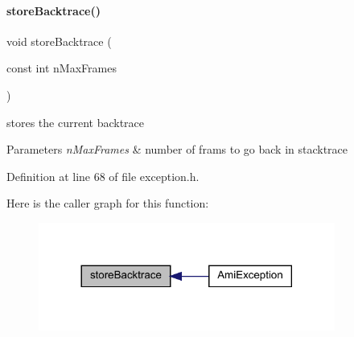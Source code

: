 \paragraph{\texorpdfstring{store\+Backtrace()}{storeBacktrace()}}
{\footnotesize\ttfamily void store\+Backtrace (\begin{DoxyParamCaption}\item[{const int}]{n\+Max\+Frames }\end{DoxyParamCaption})}

stores the current backtrace 
\begin{DoxyParams}{Parameters}
{\em n\+Max\+Frames} & number of frams to go back in stacktrace \\
\hline
\end{DoxyParams}


Definition at line 68 of file exception.\+h.

Here is the caller graph for this function\+:
\nopagebreak
\begin{figure}[H]
\begin{center}
\leavevmode
\includegraphics[width=276pt]{classamici_1_1_ami_exception_a795d2a9009cbc53d5a602e621a3a6450_icgraph}
\end{center}
\end{figure}
